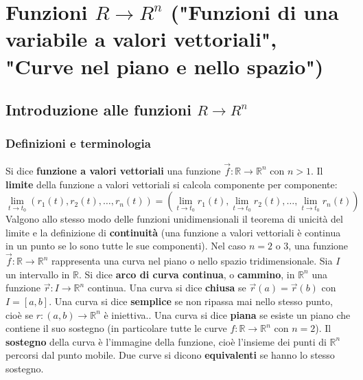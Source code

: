 \section{Funzioni $R \rightarrow R^n$ ("Funzioni di una variabile a valori vettoriali", "Curve nel piano e nello spazio")}
\subsection{Introduzione alle funzioni $R \rightarrow R^n$}
\subsubsection{Definizioni e terminologia}
Si dice \textbf{funzione a valori vettoriali} una funzione $\vec{f} : \mathbb{R} \rightarrow  \mathbb{R}^n$ con $n > 1$.\newline
\newline
Il \textbf{limite} della funzione a valori vettoriali si calcola componente per componente:
\[
    \lim_{t\rightarrow t_0}(r_1(t), r_2(t), \dots, r_n(t)) = \left(\lim_{t\rightarrow t_0}r_1(t), \lim_{t\rightarrow t_0}r_2(t), \dots, \lim_{t\rightarrow t_0}r_n(t)\right)
\]
Valgono allo stesso modo delle funzioni unidimensionali il teorema di unicità del limite e la definizione di \textbf{continuità} (una funzione a valori vettoriali è continua in un punto se lo sono tutte le sue componenti).\newline
\newline
Nel caso $n = 2$ o $3$, una funzione $\vec{f} : \mathbb{R} \rightarrow  \mathbb{R}^n$ rappresenta una curva nel piano o nello spazio tridimensionale.\newline
\newline
Sia $I$ un intervallo in $\mathbb{R}$. Si dice \textbf{arco di curva continua}, o \textbf{cammino}, in $\mathbb{R}^n$ una funzione $\vec{r}: I \rightarrow \mathbb{R}^n$ continua.\newline
\newline
Una curva si dice \textbf{chiusa} se $\vec{r}(a) = \vec{r}(b)$ con $I=[a,b]$.\newline
\newline
Una curva si dice \textbf{semplice} se non ripassa mai nello stesso punto, cioè se $r:(a,b) \rightarrow \mathbb{R}^n$ è iniettiva..\newline
\newline
Una curva si dice \textbf{piana} se esiste un piano che contiene il suo sostegno (in particolare tutte le curve  $f: \mathbb{R} \rightarrow \mathbb{R}^n$ con $n=2$).\newline
\newline
Il \textbf{sostegno} della curva è l'immagine della funzione, cioè l'insieme dei punti di $\mathbb{R}^n$ percorsi dal punto mobile.\newline
\newline
Due curve si dicono \textbf{equivalenti} se hanno lo stesso sostegno.
